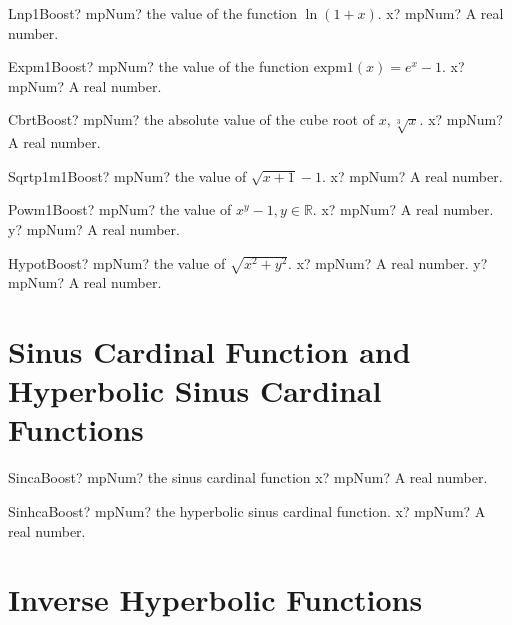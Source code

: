 \documentclass[12pt,a4paper,openany]{book}
\begin{document}
\begin{mpFunctionsExtract}
\mpFunctionOne
{Lnp1Boost? mpNum? the value of the function $\ln(1+x)$.}
{x? mpNum? A real number.}
\end{mpFunctionsExtract}

\begin{mpFunctionsExtract}
\mpFunctionOne
{Expm1Boost? mpNum? the value of the function $\text{expm1}(x) = e^{x}-1$.}
{x? mpNum? A real number.}
\end{mpFunctionsExtract}

\begin{mpFunctionsExtract}
\mpFunctionOne
{CbrtBoost? mpNum? the absolute value of the cube root of $x, \sqrt[3]{x}$.}
{x? mpNum? A real number.}
\end{mpFunctionsExtract}

\begin{mpFunctionsExtract}
\mpFunctionOne
{Sqrtp1m1Boost? mpNum? the value of $\sqrt{x+1}-1$.}
{x? mpNum? A real number.}
\end{mpFunctionsExtract}

\begin{mpFunctionsExtract}
\mpFunctionTwo
{Powm1Boost? mpNum? the value of $x^y-1, y \in  \mathbb{R}$.}
{x? mpNum? A real number.}
{y? mpNum? A real number.}
\end{mpFunctionsExtract}

\begin{mpFunctionsExtract}
\mpFunctionTwo
{HypotBoost? mpNum? the value of $\sqrt{x^2+y^2}$.}
{x? mpNum? A real number.}
{y? mpNum? A real number.}
\end{mpFunctionsExtract}

\section{Sinus Cardinal Function and Hyperbolic Sinus Cardinal Functions}

\begin{mpFunctionsExtract}
\mpFunctionOne
{SincaBoost? mpNum? the sinus cardinal function}
{x? mpNum? A real number.}
\end{mpFunctionsExtract}

\begin{mpFunctionsExtract}
\mpFunctionOne
{SinhcaBoost? mpNum? the hyperbolic sinus cardinal function.}
{x? mpNum? A real number.}
\end{mpFunctionsExtract}

\section{Inverse Hyperbolic Functions}
\end{document}
